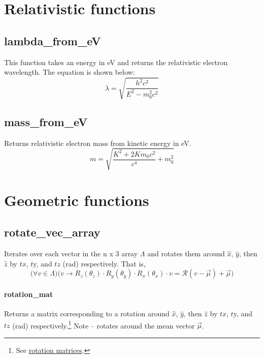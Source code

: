 \documentclass{article}
\begin{document}
	\maketitle
	\tableofcontents
	\newpage
	\section{Relativistic functions}
		\subsection{lambda\_from\_eV}
			This function takes an energy in eV and returns the 	relativistic electron wavelength. The equation is shown below:
			\begin{equation}
				\lambda = \sqrt{\frac{h^2c^2}{E^2-m_0^2 c^2}}
			\end{equation}
		\subsection{mass\_from\_eV}
			Returns relativistic electron mass from kinetic energy in eV.
				\begin{equation}
					m = \sqrt{\frac{K^2+2Km_0c^2}{c^4}+m_0^2}
				\end{equation}
	\section{Geometric functions}
		\subsection{rotate\_vec\_array}
			Iterates over each vector in the n x 3 array $\Lambda$ and rotates them around $\hat{x}$, $\hat{y}$, then $\hat{z}$ by $tx$, $t$y, and $tz$ (rad) respectively.
			That is, 
			\begin{equation}
				\Bigg(\forall v\in \Lambda\Bigg)\Bigg(v\to R_z(\theta_z)\cdot R_y(\theta_y)\cdot R_x(\theta_x) \cdot v = \mathcal{R}(v-\vec{\mu}) + \vec{\mu}\Bigg)
			\end{equation}
	
		\paragraph{rotation\_mat}
			Returns a matrix corresponding to a rotation around $\hat{x}$, $\hat{y}$, then $\hat{z}$ by $tx$, $t$y, and $tz$ (rad) respectively.\footnote{See  \href{https://en.wikipedia.org/wiki/Rotation\_matrix}{rotation matrices}.} Note -- rotates around the mean vector $\vec{\mu}$.
				
\end{document}
